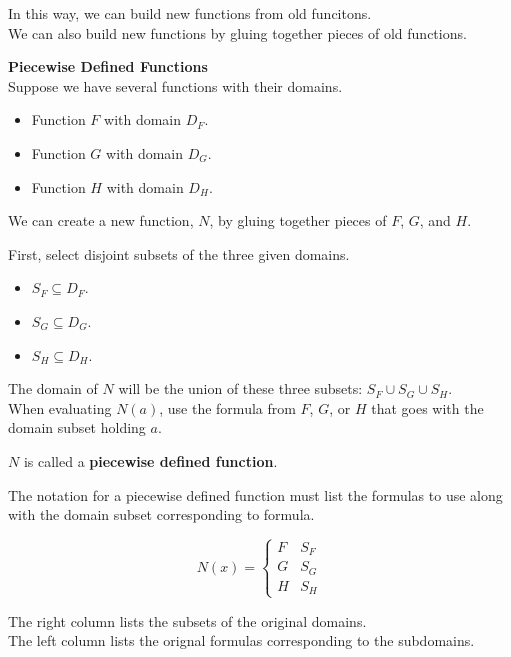 \documentclass{ximera}
\begin{document}
In this way, we can build new functions from old funcitons. \\

We can also build new functions by gluing together pieces of old functions.



\begin{template} \textbf{\textcolor{blue!55!black}{Piecewise Defined Functions}} \\


Suppose we have several functions with their domains.

\begin{itemize}
\item Function $F$ with domain $D_F$. 
\item Function $G$ with domain $D_G$. 
\item Function $H$ with domain $D_H$. 
\end{itemize}


We can create a new function, $N$, by gluing together pieces of $F$, $G$, and $H$.


First, select disjoint subsets of the three given domains.


\begin{itemize}
\item $S_F \subseteq D_F$. 
\item $S_G \subseteq D_G$. 
\item $S_H \subseteq D_H$. 
\end{itemize}


The domain of $N$ will be the union of these three subsets: $S_F \cup S_G \cup S_H$. \\

When evaluating $N(a)$, use the formula from $F$, $G$, or $H$ that goes with the domain subset holding $a$.


\end{template}

$N$ is called a \textbf{\textcolor{blue!55!black}{piecewise defined function}}. \\




\begin{notation}


The notation for a piecewise defined function must list the formulas to use along with the domain subset corresponding to formula.



\[
N(x) = 
\begin{cases}
  F & S_F     \\
  G & S_G \\
  H & S_H
\end{cases}
\]



The right column lists the subsets of the original domains.  \\
The left column lists the orignal formulas corresponding to the subdomains.

\end{notation}
\end{document}
